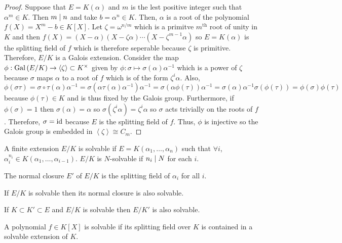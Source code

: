 \documentclass[12pt]{extarticle}
\begin{document}
\begin{proof}
Suppose that $E = K(\alpha)$ and $m$ is the lest positive integer such that $\alpha^m \in K$. Then $m \mid n$ and take $b = \alpha^n \in K$. Then, $\alpha$ is a root of the polynomial $f(X) = X^m - b \in K[X]$. Let $\zeta = \omega^{n/m}$ which is a primitve $m^{\mathrm{th}}$ root of unity in $K$ and then $f(X) = (X - \alpha)(X - \zeta \alpha) \cdots (X - \zeta^{m-1} \alpha)$ so $E = K(\alpha)$ is the splitting field of $f$ which is therefore seperable because $\zeta$ is primitive. Therefore, $E/K$ is a Galois extension. Consider the map $\phi : \mathrm{Gal}\left( E/K \right) \to \left< \zeta \right> \subset K^\times$ given by $\phi : \sigma \mapsto \sigma(\alpha) \alpha^{-1}$ which is a power of $\zeta$ because $\sigma$ maps $\alpha$ to a root of $f$ which is of the form $\zeta^i \alpha$. Also, \[\phi(\sigma \tau) = \sigma \circ \tau(\alpha) \alpha^{-1} = \sigma(\alpha \tau(\alpha) \alpha^{-1}) \alpha^{-1} = \sigma(\alpha \phi(\tau)) \alpha^{-1} = \sigma(\alpha) \alpha^{-1} \sigma(\phi(\tau)) = \phi(\sigma) \phi(\tau)\] because $\phi(\tau) \in K$ and is thus fixed by the Galois group. Furthermore, if $\phi(\sigma) = 1$ then $\sigma(\alpha) = \alpha$ so $\sigma(\zeta^i \alpha) = \zeta^i \alpha$ so $\sigma$ acts trivially on the roots of $f$. Therefore, $\sigma = \mathrm{id} $ because $E$ is the splitting field of $f$. Thus, $\phi$ is injective so the Galois group is embedded in $\left< \zeta \right> \cong C_m$. 
\end{proof}

\begin{definition}
A finite extension $E/K$ is solvable if $E = K(\alpha_1, \dots, \alpha_n)$ such that $\forall i$, $\alpha_i^{n_i} \in K(\alpha_1, \dots, \alpha_{i-1})$. $E/K$ is $N$-solvable if $n_i \mid N$ for each $i$. 
\end{definition}

\begin{definition}
The normal closure $E'$ of $E/K$ is the splitting field of $\alpha_i$ for all $i$.
\end{definition}

\begin{proposition}
If $E/K$ is solvable then its normal closure is also solvable.
\end{proposition}

\begin{proposition}
If $K \subset K' \subset E$ and $E/K$ is solvable then $E/K'$ is also solvable.
\end{proposition}

\begin{definition}
A polynomial $f \in K[X]$ is solvable if its splitting field over $K$ is contained in a solvable extension of $K$.
\end{definition}
\end{document}
